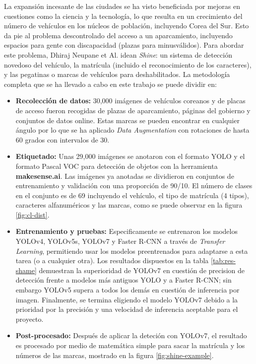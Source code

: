\documentclass[11pt]{article}
\begin{document}
La expansión incesante de las ciudades se ha visto beneficiada por mejoras en cuestiones como la ciencia y la tecnología, lo que resulta en un crecimiento del número de vehículos en los núcleos de población, incluyendo Corea del Sur. Esto da pie al problema descontrolado del acceso a un aparcamiento, incluyendo espacios para gente con discapacidad (plazas para minusválidos). Para abordar este problema, Dhiraj Neupane et Al.\cite{neupane2023shinedeeplearningbasedaccessible} idean \textit{Shine}: un sistema de detección novedoso del vehículo, la matrícula (incluido el reconocimiento de los caracteres), y las pegatinas o marcas de vehículos para deshabilitados. La metodología completa que se ha llevado a cabo en este trabajo se puede dividir en:
\begin{itemize}
    \item \textbf{Recolección de datos:} 30,000 imágenes de vehículos coreanos y de placas de acceso fueron recogidas de plazas de aparcamiento, páginas del gobierno y conjuntos de datos online. Estas marcas se pueden encontrar en cualquier ángulo por lo que se ha aplicado \textit{Data Augmentation} con rotaciones de hasta 60 grados con intervalos de 30. 
    \item \textbf{Etiquetado:} Unas 29,000 imágenes se anotaron con el formato YOLO y el formato Pascal VOC para detección de objetos con la herramienta \textbf{makesense.ai}. Las imágenes ya anotadas se dividieron en conjuntos de entrenamiento y validación con una proporción de 90/10. El número de clases en el conjunto es de 69 incluyendo el vehículo, el tipo de matrícula (4 tipos), caracteres alfanuméricos y las marcas, como se puede observar en la figura \ref{fig:cl-dist}.
    \item \textbf{Entrenamiento y pruebas:}  Especificamente se entrenaron los modelos YOLOv4, YOLOv5s, YOLOv7 y Faster R-CNN a través de \textit{Transfer Learning}, permitiendo usar los modelos preentrenados para adaptarse a esta tarea (o a cualquier otra). Los resultados dispuestos en la tabla \ref{tab:res-shame} demuestran la superioridad de YOLOv7 en cuestión de precision de detección frente a modelos más antiguos YOLO y a Faster R-CNN; sin embargo YOLOv5 supera a todos los demás en cuestión de inferencia por imagen. Finalmente, se termina eligiendo el modelo YOLOv7 debido a la prioridad por la precisión y una velocidad de inferencia aceptable para el proyecto. 
    \item \textbf{Post-procesado:} Después de aplicar la deteción con YOLOv7, el resultado es procesado por medio de matemática simple para sacar la matrícula y los números de las marcas, mostrado en la figura \ref{fig:shine-example}.
\end{itemize}
\end{document}
